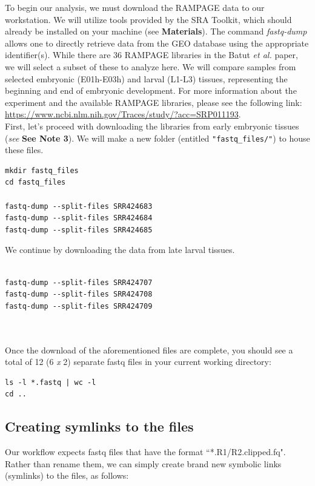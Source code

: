 \documentclass[runningheads,a4paper]{llncs}
\begin{document}
\begin{linenumbers}
To begin our analysis, we must download the RAMPAGE data to our workstation. 
We will utilize tools provided by the SRA Toolkit, which should already be installed on your machine (see \textbf{Materials}).
The command \textit{fastq-dump} allows one to directly retrieve data from the GEO database using the appropriate identifier(s).
While there are 36 RAMPAGE libraries in the Batut \textit{et al.} paper, we will select a subset of these to analyze here.
We will compare samples from selected embryonic (E01h-E03h) and larval (L1-L3) tissues, representing the beginning and end of embryonic development.
For more information about the experiment and the available RAMPAGE libraries, please see the following link: \url{https://www.ncbi.nlm.nih.gov/Traces/study/?acc=SRP011193}.\\

First, let's proceed with downloading the libraries from early embryonic tissues (\textit{see} \textbf{See Note 3}).
We will make a new folder (entitled \texttt{"fastq\_files/"}) to house these files.

\noindent
\begin{verbatim}
mkdir fastq_files
cd fastq_files

fastq-dump --split-files SRR424683
fastq-dump --split-files SRR424684
fastq-dump --split-files SRR424685
\end{verbatim}

\noindent
We continue by downloading the data from late larval tissues.

\begin{verbatim}

fastq-dump --split-files SRR424707
fastq-dump --split-files SRR424708
fastq-dump --split-files SRR424709



\end{verbatim}

\noindent
Once the download of the aforementioned files are complete, you should see a total of 12 (6 \textit{x} 2) separate fastq files in your current working directory:

\noindent
\begin{verbatim}
ls -l *.fastq | wc -l
cd ..
\end{verbatim}

\subsection{Creating symlinks to the files}
Our workflow expects fastq files that have the format ``*.R1/R2.clipped.fq". 
Rather than rename them, we can simply create brand new symbolic links (symlinks) to the files, as follows:


\end{linenumbers}
\end{document}
